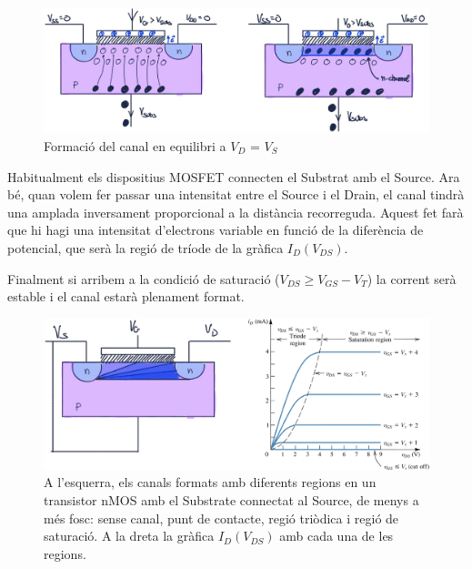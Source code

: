 \documentclass[11pt,a4paper]{article}
\begin{document}
\begin{figure}[h]
    \centering
    \includegraphics[width=0.6\paperwidth]{images/nmos23.png}
    \caption{Formació del canal en equilibri a $V_D$ = $V_S$}
    \label{fig:nmos23}
\end{figure}

Habitualment els dispositius MOSFET connecten el Substrat amb el Source. Ara bé, quan volem fer passar una intensitat entre el Source i el Drain, el canal tindrà una amplada inversament proporcional a la distància recorreguda. Aquest fet farà que hi hagi una intensitat d'electrons variable en funció de la diferència de potencial, que serà la regió de tríode de la gràfica $I_D(V_{DS})$. 

Finalment si arribem a la condició de saturació ($V_{DS} \ge V_{GS}-V_T$) la corrent serà estable i el canal estarà plenament format.

\begin{figure}[h]
    \centering
    \includegraphics[width=0.6\paperwidth]{images/nmos idvds.png}
    \caption{A l'esquerra, els canals formats amb diferents regions en un transistor nMOS amb el Substrate connectat al Source, de menys a més fosc: sense canal, punt de contacte, regió triòdica i regió de saturació. A la dreta la gràfica $I_D(V_{DS})$ amb cada una de les regions.}
    \label{fig:nmos23}
\end{figure}
\end{document}
